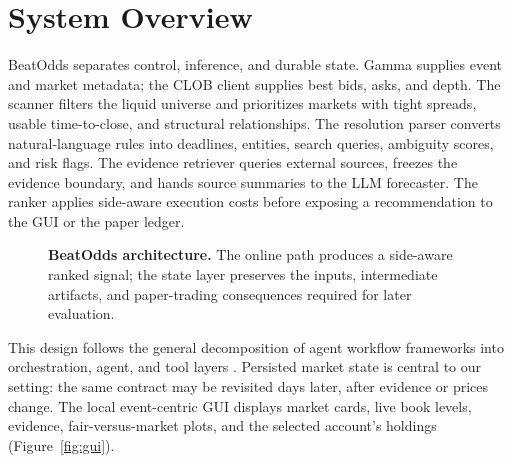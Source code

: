 \section{System Overview}

BeatOdds separates control, inference, and durable state. Gamma supplies event and market metadata; the CLOB client supplies best bids, asks, and depth. The scanner filters the liquid universe and prioritizes markets with tight spreads, usable time-to-close, and structural relationships. The resolution parser converts natural-language rules into deadlines, entities, search queries, ambiguity scores, and risk flags. The evidence retriever queries external sources, freezes the evidence boundary, and hands source summaries to the LLM forecaster. The ranker applies side-aware execution costs before exposing a recommendation to the GUI or the paper ledger.

\begin{figure}[t]
\centering\small
{}
\caption{\textbf{BeatOdds architecture.} The online path produces a side-aware ranked signal; the state layer preserves the inputs, intermediate artifacts, and paper-trading consequences required for later evaluation.}
\label{fig:architecture}
\end{figure}

This design follows the general decomposition of agent workflow frameworks into orchestration, agent, and tool layers \citep{miroflow2026}. Persisted market state is central to our setting: the same contract may be revisited days later, after evidence or prices change. The local event-centric GUI displays market cards, live book levels, evidence, fair-versus-market plots, and the selected account's holdings (Figure~\ref{fig:gui}).
